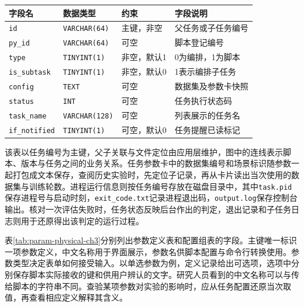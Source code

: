\begin{table}[!htbp]
    \centering\small
    \label{tab:task-physical-ch3}
    \begin{tabular}{@{}P{7em}P{7em}P{6.5em}P{9em}@{}}
        \toprule
        字段名                   & 数据类型                  & 约束     & 字段说明      \\ \midrule
        \texttt{id}           & \texttt{VARCHAR(64)}  & 主键，非空  & 父任务或子任务编号 \\
        \texttt{py\_id}       & \texttt{VARCHAR(64)}  & 可空     & 脚本登记编号    \\
        \texttt{type}         & \texttt{TINYINT(1)}   & 非空，默认1 & 0为编排，1为脚本 \\
        \texttt{is\_subtask}  & \texttt{TINYINT(1)}   & 非空，默认0 & 1表示编排子任务  \\
        \texttt{config}       & \texttt{TEXT}         & 可空     & 数据集及参数卡快照 \\
        \texttt{status}       & \texttt{INT}          & 可空     & 任务执行状态码   \\
        \texttt{task\_name}   & \texttt{VARCHAR(128)} & 可空     & 列表展示的任务名  \\
        \texttt{if\_notified} & \texttt{TINYINT(1)}   & 可空，默认0 & 任务提醒已读标记  \\
        \bottomrule
    \end{tabular}
\end{table}

该表以任务编号为主键，父子关联与文件定位由应用层维护，图中的连线表示脚本、版本与任务之间的业务关系。任务参数卡中的数据集编号和场景标识随参数一起打包成文本保存，查阅历史实验时，先定位子记录，再从卡片读出当次使用的数据集与训练轮数。进程运行信息则按任务编号存放在磁盘目录中，其中\texttt{task.pid}保存进程号与启动时刻，\texttt{exit\_code.txt}记录进程退出码，\texttt{output.log}保存控制台输出。核对一次评估失败时，任务状态反映后台作出的判定，退出记录和子任务日志则用于还原得出该判定的运行过程。

表\ref{tab:param-physical-ch3}分别列出参数定义表和配置组表的字段。主键唯一标识一项参数定义，中文名称用于界面展示，参数名供脚本配置与命令行转换使用。参数类型决定表单如何接受输入。以单选参数为例，定义记录给出可选项，选项中分别保存脚本实际接收的键和供用户辨认的文字。研究人员看到的中文名称可以与传给脚本的字符串不同。查验某项参数对实验的影响时，应从任务配置还原当次取值，再查看相应定义解释其含义。

